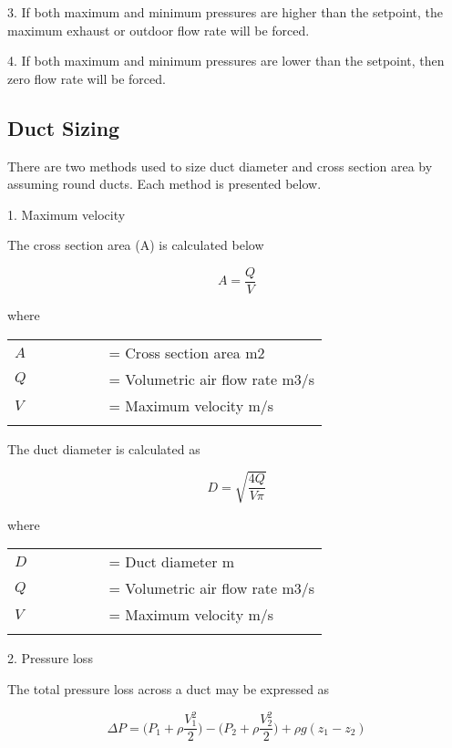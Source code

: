 3. If both maximum and minimum pressures are higher than the setpoint, the maximum exhaust or outdoor flow rate will be forced. 

4. If both maximum and minimum pressures are lower than the setpoint, then zero flow rate will be forced.

\subsection{Duct Sizing}\label{duct-sizingl}

There are two methods used to size duct diameter and cross section area by assuming round ducts. Each method is presented below.

1. Maximum velocity

The cross section area (A) is calculated below

\begin{equation}
A =  \frac{Q}{V} 
\end{equation}

where 

\begin{tabular}{lp{0.7\linewidth}}
\\
$A$ &= Cross section area {m2}\\
$Q$ &= Volumetric air flow rate {m3/s}\\
$V $ &= Maximum velocity {m/s}\\
\\
\end{tabular}

The duct diameter is calculated as

\begin{equation}
D = \sqrt{\frac{4Q}{V \pi } } 
\end{equation}

where

\begin{tabular}{lp{0.7\linewidth}}
\\
$D$ &= Duct diameter {m}\\
$Q$ &= Volumetric air flow rate {m3/s}\\
$V $ &= Maximum velocity {m/s}\\
\\
\end{tabular}


2. Pressure loss

The total pressure loss across a duct may be expressed as

\begin{equation}
\Delta P =  \big( P_{1} +  \rho  \frac{V_{1}^2}{2}  )  - \big( P_{2} +  \rho  \frac{V_{2}^2}{2}  ) +  \rho g(z_{1} - z_{2} ) 
\end{equation}

